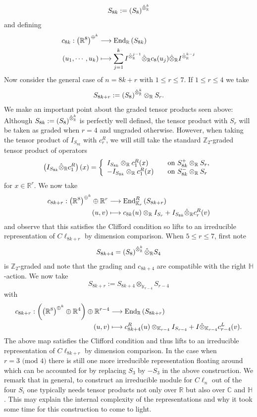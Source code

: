 \documentclass[openany, 11pt]{article}
\theoremstyle{definition}
\theoremstyle{remark}
\def\lp{\ensuremath{\left(}}
\def\rp{\ensuremath{\right)}}
\def\bC{\ensuremath{\mathbb{C}}}
\def\bH{\ensuremath{\mathbb{H}}}
\def\bR{\ensuremath{\mathbb{R}}}
\def\bZ{\ensuremath{\mathbb{Z}}}
\def\bK{\ensuremath{\mathbb{K}}}
\def\End{\ensuremath{\textnormal{End}}}
\begin{document}
\[
    S_{8k}:=\lp S_8\rp^{\hat{\otimes}^k_{\bR}}
\]
and defining
\begin{align*}
    c_{8k}:\lp\bR^8\rp^{\oplus^k}&\longrightarrow \End_{\bR}\lp S_{8k}\rp\\
    \lp u_1,\cdots,u_k\rp&\longmapsto \sum_{j=1}^{k}I^{\hat{\otimes}^{j-1}_{\bR}}\hat{\otimes}_{\bR}c_8(u_j)\hat{\otimes}_{\bR}I^{\hat{\otimes}^{k-j}_{\bR}}
\end{align*}
Now consider the general case of $n=8k+r$ with $1\leq r\leq 7$. If $1\leq r\leq 4$ we take
\[
    S_{8k+r}:=\lp S_8\rp^{\hat{\otimes}^k_{\bR}}\otimes_{\bR}S_r.
\]
We make an important point about the graded tensor products seen above: Although $S_{8k}:=\lp S_8\rp^{\hat{\otimes}^k_{\bR}}$ is perfectly well defined, the tensor product with $S_r$ will be taken as graded when $r=4$ and ungraded otherwise. However, when taking the tensor product of $I_{S_{8k}}$ with $c^R_r$, we will still take the standard $\bZ_2$-graded tensor product of operators
\begin{align*}
    \lp I_{S_{8k}}\hat{\otimes}_{\bR}c^R_1\rp(x) = \left\{
        \begin{array}{ll}
             I_{S_{8k}}\otimes_{\bR}c^R_1(x)  & \quad \text{on } S^+_{8k}\otimes_{\bR}S_r, \\
            - I_{S_{8k}}\otimes_{\bR}c^R_1(x)  & \quad \text{on } S^-_{8k}\otimes_{\bR}S_r
        \end{array}
    \right.
\end{align*}
for $x\in\bR^r$. We now take
\begin{align*}
    c_{8k+r}:\lp\bR^8\rp^{\oplus^k}\oplus\bR^r&\longrightarrow\End^R_{\bK_r}\lp S_{8k+r}\rp\\
    \lp u,v\rp&\longmapsto c_{8k}(u)\otimes_{\bR}I_{S_r}+I_{S_{8k}}\hat{\otimes}_{\bR}c^R_r(v)
\end{align*}
and observe that this satisfies the Clifford condition so lifts to an irreducible representation of $C\ell_{8k+r}$ by dimension comparison. When $5\leq r\leq 7$, first note 
\[
    S_{8k+4}=\lp S_8\rp^{\hat{\otimes}^k_{\bR}}\hat{\otimes}_{\bR}S_4
\]
is $\bZ_2$-graded and note that the grading and $c_{8k+4}$ are compatible with the right $\bH$-action. We now take
\[
    S_{8k+r}:=S_{8k+4}\otimes_{\bK_{r-4}}S_{r-4}
\]
with
\begin{align*}
    c_{8k+r}:\lp\lp\bR^8\rp^{\oplus^k}\oplus\bR^4\rp\oplus\bR^{r-4}&\longrightarrow \End_{\bR}\lp S_{8k+r}\rp\\
    \lp u,v\rp&\longmapsto c^R_{8k+4}(u)\otimes_{\bK_{r-4}} I_{S_{r-4}}+I\hat{\otimes}_{\bK_{r-4}}c^L_{r-4}(v).
\end{align*}
The above map satisfies the Clifford condition and thus lifts to an irreducible representation of $C\ell_{8k+r}$ by dimension comparison. In the case when $r=3\text{ (mod $4$)}$ there is still one more irreducible representation floating around which can be accounted for by replacing $S_3$ by $-S_3$ in the above construction. We remark that in general, to construct an irreducible module for $C\ell_n$ out of the four $S_i$ one typically needs tensor products not only over $\bR$ but also over $\bC$ and $\bH$. This may explain the internal complexity of the representations and why it took some time for this construction to come to light. 
\end{document}
